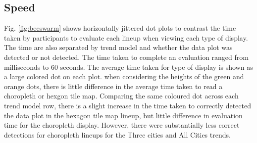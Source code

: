 \documentclass[conference,final,]{IEEEtran}
\begin{document}
\hypertarget{speed}{%
\subsection{Speed}\label{speed}}

Fig. \ref{fig:beeswarm} shows horizontally jittered dot plots to contrast the time taken by participants to evaluate each lineup when viewing each type of display. The time are also separated by trend model and whether the data plot was detected or not detected. The time taken to complete an evaluation ranged from milliseconds to 60 seconds. The average time taken for type of display is shown as a large colored dot on each plot. when considering the heights of the green and orange dots, there is little difference in the average time taken to read a choropleth or hexgon tile map. Comparing the same coloured dot across each trend model row, there is a slight increase in the time taken to correctly detected the data plot in the hexagon tile map lineup, but little difference in evaluation time for the choropleth display. However, there were substantially less correct detections for choropleth lineups for the Three cities and All Cities trends.
\end{document}
